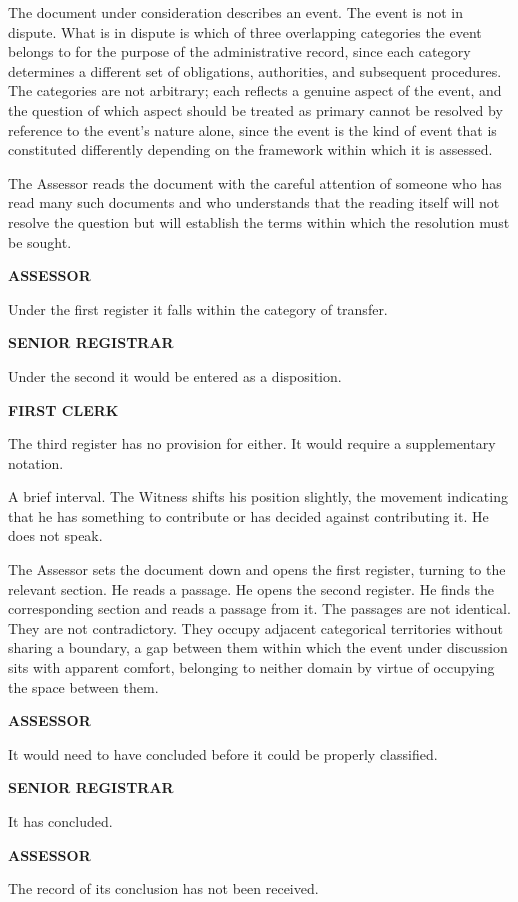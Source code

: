 \documentclass[12pt, oneside]{article}
\newenvironment{action}{%
  \vspace{0.6em}%
  \noindent\ignorespaces%
}{%
  \par\vspace{0.6em}%
}
\newcommand{\character}[1]{%
  \vspace{0.8em}%
  \begin{center}%
    \bfseries\MakeUppercase{#1}%
  \end{center}%
  \vspace{-0.3em}%
}
\newenvironment{dialogue}{%
  \vspace{0.2em}%
  \begin{list}{}{%
    \setlength{\leftmargin}{1.2in}%
    \setlength{\rightmargin}{0.8in}%
    \setlength{\itemsep}{0.6em}%
    \setlength{\parsep}{0pt}%
  }%
}{%
  \end{list}%
  \vspace{0.4em}%
}
\newcommand{\says}[2]{%
  \character{#1}%
  \begin{dialogue}\item #2\end{dialogue}%
}
\begin{document}
\begin{action}
The document under consideration describes an event. The event is not in dispute. What is in dispute is which of three overlapping categories the event belongs to for the purpose of the administrative record, since each category determines a different set of obligations, authorities, and subsequent procedures. The categories are not arbitrary; each reflects a genuine aspect of the event, and the question of which aspect should be treated as primary cannot be resolved by reference to the event's nature alone, since the event is the kind of event that is constituted differently depending on the framework within which it is assessed.

The Assessor reads the document with the careful attention of someone who has read many such documents and who understands that the reading itself will not resolve the question but will establish the terms within which the resolution must be sought.
\end{action}

\says{Assessor}{Under the first register it falls within the category of transfer.}

\says{Senior Registrar}{Under the second it would be entered as a disposition.}

\says{First Clerk}{The third register has no provision for either. It would require a supplementary notation.}

\begin{action}
A brief interval. The Witness shifts his position slightly, the movement indicating that he has something to contribute or has decided against contributing it. He does not speak.

The Assessor sets the document down and opens the first register, turning to the relevant section. He reads a passage. He opens the second register. He finds the corresponding section and reads a passage from it. The passages are not identical. They are not contradictory. They occupy adjacent categorical territories without sharing a boundary, a gap between them within which the event under discussion sits with apparent comfort, belonging to neither domain by virtue of occupying the space between them.
\end{action}

\says{Assessor}{It would need to have concluded before it could be properly classified.}

\says{Senior Registrar}{It has concluded.}

\says{Assessor}{The record of its conclusion has not been received.}
\end{document}
